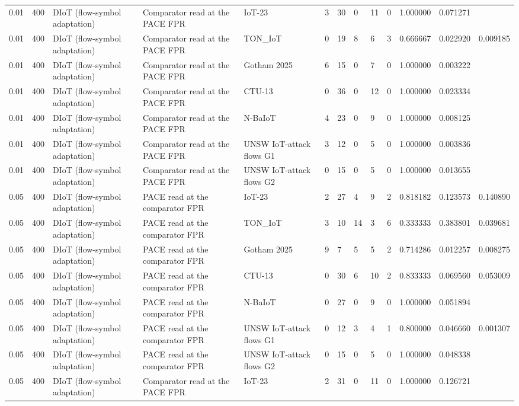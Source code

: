 \begin{tabular}{lllllllllllll}
0.01 & 400 & DIoT (flow-symbol adaptation) & Comparator read at the PACE FPR & IoT-23 & 3 & 30 & 0 & 11 & 0 & 1.000000 & 0.071271 &  \\
0.01 & 400 & DIoT (flow-symbol adaptation) & Comparator read at the PACE FPR & TON\_IoT & 0 & 19 & 8 & 6 & 3 & 0.666667 & 0.022920 & 0.009185 \\
0.01 & 400 & DIoT (flow-symbol adaptation) & Comparator read at the PACE FPR & Gotham 2025 & 6 & 15 & 0 & 7 & 0 & 1.000000 & 0.003222 &  \\
0.01 & 400 & DIoT (flow-symbol adaptation) & Comparator read at the PACE FPR & CTU-13 & 0 & 36 & 0 & 12 & 0 & 1.000000 & 0.023334 &  \\
0.01 & 400 & DIoT (flow-symbol adaptation) & Comparator read at the PACE FPR & N-BaIoT & 4 & 23 & 0 & 9 & 0 & 1.000000 & 0.008125 &  \\
0.01 & 400 & DIoT (flow-symbol adaptation) & Comparator read at the PACE FPR & UNSW IoT-attack flows G1 & 3 & 12 & 0 & 5 & 0 & 1.000000 & 0.003836 &  \\
0.01 & 400 & DIoT (flow-symbol adaptation) & Comparator read at the PACE FPR & UNSW IoT-attack flows G2 & 0 & 15 & 0 & 5 & 0 & 1.000000 & 0.013655 &  \\
0.05 & 400 & DIoT (flow-symbol adaptation) & PACE read at the comparator FPR & IoT-23 & 2 & 27 & 4 & 9 & 2 & 0.818182 & 0.123573 & 0.140890 \\
0.05 & 400 & DIoT (flow-symbol adaptation) & PACE read at the comparator FPR & TON\_IoT & 3 & 10 & 14 & 3 & 6 & 0.333333 & 0.383801 & 0.039681 \\
0.05 & 400 & DIoT (flow-symbol adaptation) & PACE read at the comparator FPR & Gotham 2025 & 9 & 7 & 5 & 5 & 2 & 0.714286 & 0.012257 & 0.008275 \\
0.05 & 400 & DIoT (flow-symbol adaptation) & PACE read at the comparator FPR & CTU-13 & 0 & 30 & 6 & 10 & 2 & 0.833333 & 0.069560 & 0.053009 \\
0.05 & 400 & DIoT (flow-symbol adaptation) & PACE read at the comparator FPR & N-BaIoT & 0 & 27 & 0 & 9 & 0 & 1.000000 & 0.051894 &  \\
0.05 & 400 & DIoT (flow-symbol adaptation) & PACE read at the comparator FPR & UNSW IoT-attack flows G1 & 0 & 12 & 3 & 4 & 1 & 0.800000 & 0.046660 & 0.001307 \\
0.05 & 400 & DIoT (flow-symbol adaptation) & PACE read at the comparator FPR & UNSW IoT-attack flows G2 & 0 & 15 & 0 & 5 & 0 & 1.000000 & 0.048338 &  \\
0.05 & 400 & DIoT (flow-symbol adaptation) & Comparator read at the PACE FPR & IoT-23 & 2 & 31 & 0 & 11 & 0 & 1.000000 & 0.126721 &  \\

\end{tabular}
